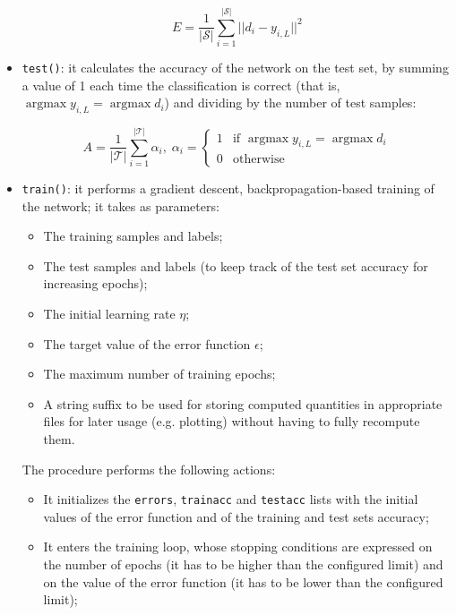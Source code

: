 \documentclass[letterpaper,headings=standardclasses]{scrartcl}
\DeclareMathOperator*{\argmax}{argmax}
\begin{document}
\begin{itemize}
    $$ E = \frac{1}{|\mathcal{S}|} \sum_{i = 1}^{|\mathcal{S}|} || d_i - y_{i,L} ||^2 $$
    
    \item \texttt{test()}: it calculates the accuracy of the network on the test set, by summing a value of 1 each time the classification is correct (that is, $ \argmax{y_{i,L}} = \argmax{d_i} $) and dividing by the number of test samples:
    
    $$ A = \frac{1}{|\mathcal{T}|} \sum_{i = 1}^{|\mathcal{T}|} \alpha_i, \; \alpha_i = \begin{cases} 1 & \text{if } \argmax{y_{i,L}} = \argmax{d_i} \\ 0 & \text{otherwise} \end{cases} $$
    
    \item \texttt{train()}: it performs a gradient descent, backpropagation-based training of the network; it takes as parameters:
    
    \begin{itemize}

        \item The training samples and labels;
        \item The test samples and labels (to keep track of the test set accuracy for increasing epochs);
        \item The initial learning rate $\eta$;
        \item The target value of the error function $\epsilon$;
        \item The maximum number of training epochs;
        \item A string suffix to be used for storing computed quantities in appropriate files for later usage (e.g. plotting) without having to fully recompute them.
    
    \end{itemize}

    The procedure performs the following actions:

    \begin{itemize}
        
        \item It initializes the \texttt{errors}, \texttt{trainacc} and \texttt{testacc} lists with the initial values of the error function and of the training and test sets accuracy;
        
        \item It enters the training loop, whose stopping conditions are expressed on the number of epochs (it has to be higher than the configured limit) and on the value of the error function (it has to be lower than the configured limit);
        

\end{itemize}
\end{itemize}
\end{document}
